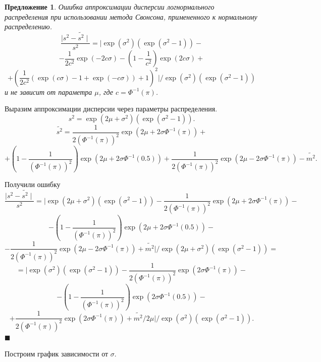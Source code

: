 \documentclass[12pt]{article}
\newtheorem{proposition}[theorem]{Предложение}
\newenvironment{Proof}{\par\noindent{\bf Доказательство.}}{\hfill$\scriptstyle\blacksquare$}
\begin{document}
	
	\begin{proposition}\label{pr6}
		Ошибка аппроксимации дисперсии логнормального распределения при использовании метода Свонсона, примененного к нормальному распределению.
			\[\dfrac{\mid s^{2} - \widetilde{s^{2}} \mid}{s^{2}} = \biggl|\exp(\sigma^{2})(\exp(\sigma^{2}-1)) -\]\[- \dfrac{1}{2c^{2}}\exp(-2c\sigma)- \left( 1- \dfrac{1}{c^{2}}\right) \exp(2c\sigma)+\]\[+ \left( \dfrac{1}{2c^{2}}(\exp(c\sigma)-1+\exp(-c\sigma)) + 1\right) ^{2}\biggr| /\exp(\sigma^{2})(\exp(\sigma^{2}-1))\]
		и не зависит от параметра $\mu$, где $c = \Phi^{-1}(\pi)$.
	\end{proposition}
	\begin{Proof}
		Выразим аппроксимации дисперсии через параметры распределения.
		\[s^{2} = \exp(2\mu+\sigma^{2})(\exp(\sigma^{2}-1)).\]
		\[\tilde{s^{2}} = \dfrac{1}{2(\Phi^{-1}(\pi))^{2}}\exp(2\mu+2\sigma\Phi^{-1}(\pi))+ \]
		\[+\left(1 - \dfrac{1}{(\Phi^{-1}(\pi))^{2}}\right)\exp(2\mu+2\sigma\Phi^{-1}(0.5))+ \dfrac{1}{2(\Phi^{-1}(\pi))^{2}}\exp(2\mu-2\sigma\Phi^{-1}(\pi)) - \tilde{m^{2}}.\]
		
		Получили ошибку
		\[\dfrac{\mid s^{2} - \widetilde{s^{2}} \mid}{s^{2}} = \biggl| \exp(2\mu+\sigma^{2})(\exp(\sigma^{2}-1)) - \dfrac{1}{2(\Phi^{-1}(\pi))^{2}}\exp(2\mu+2\sigma\Phi^{-1}(\pi))-\]
		\[- \left(1 - \dfrac{1}{(\Phi^{-1}(\pi))^{2}}\right)\exp(2\mu+2\sigma\Phi^{-1}(0.5))-\]
		\[-\dfrac{1}{2(\Phi^{-1}(\pi))^{2}}\exp(2\mu-2\sigma\Phi^{-1}(\pi)) + \tilde{ m^{2}}\biggr|/\exp(2\mu+\sigma^{2})(\exp(\sigma^{2}-1))=\]
		\[=\biggl| \exp(\sigma^{2})(\exp(\sigma^{2}-1)) - \dfrac{1}{2(\Phi^{-1}(\pi))^{2}}\exp(2\sigma\Phi^{-1}(\pi))-\]
		\[- \left(1 - \dfrac{1}{(\Phi^{-1}(\pi))^{2}}\right)\exp(2\sigma\Phi^{-1}(0.5))-\]
		\[+\dfrac{1}{2(\Phi^{-1}(\pi))^{2}}\exp(2\sigma\Phi^{-1}(\pi)) + \tilde{ m^{2}}/2\mu\biggr|/\exp(\sigma^{2})(\exp(\sigma^{2}-1)).\]
	\end{Proof}
	
	Построим график зависимости от $\sigma$.
	
\end{document}
